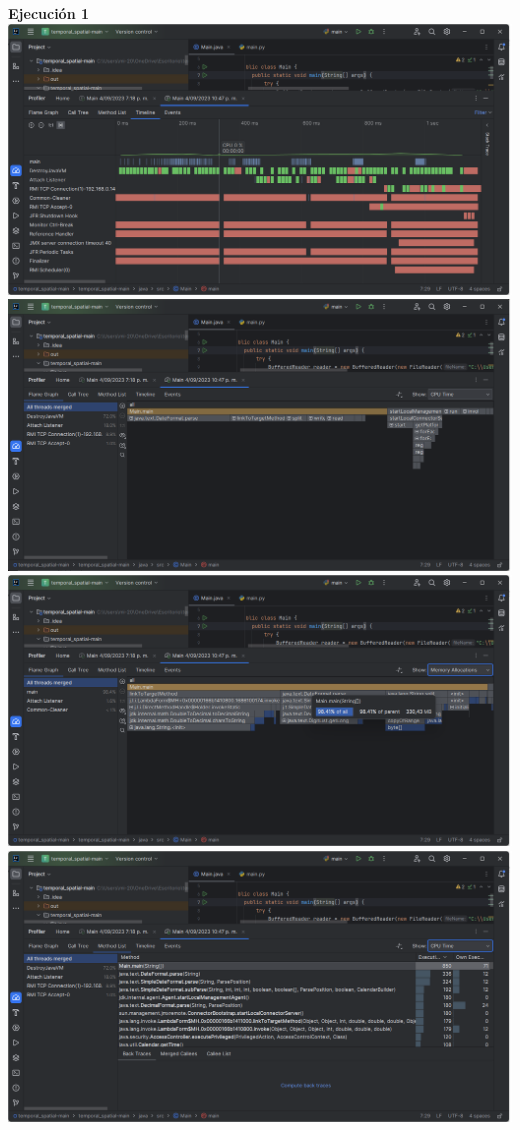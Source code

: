 \documentclass[a4paper,twocolumn,10pt]{article}
\begin{document}
\textbf{Ejecución 1\\}
\includegraphics[width=0.9\linewidth]{HP Ryzen 5500U/Timeline 1.png}
\includegraphics[width=0.9\linewidth]{HP Ryzen 5500U/FlameGraph CPU 1.png}
\includegraphics[width=0.9\linewidth]{HP Ryzen 5500U/FlameGraph Memory Allocation 1.png}
\includegraphics[width=0.9\linewidth]{HP Ryzen 5500U/Method List CPU 1.png}
\end{document}

